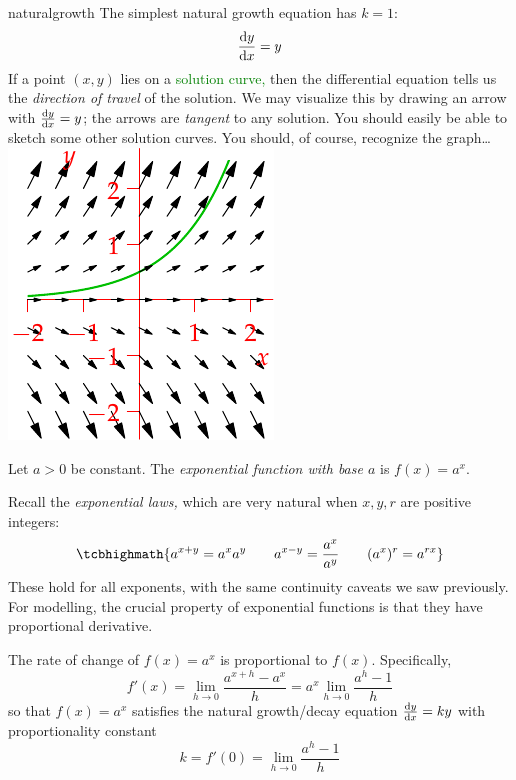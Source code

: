 \begin{example}[lower separated=false, sidebyside, sidebyside align=top seam, sidebyside gap=0pt, righthand width=0.28\linewidth]{}{naturalgrowth}
	The simplest natural growth equation has $k=1$:
	\[
		\diff[y]{x}=y
	\]
	If a point $(x,y)$ lies on a \textcolor{Green}{solution curve,} then the differential equation tells us the \emph{direction of travel} of the solution. We may visualize this by drawing an arrow with  $\diff[y]{x}=y$; the arrows are \emph{tangent} to any solution.\footnotemark{} You should easily be able to sketch some other solution curves.\smallbreak
	You should, of course, recognize the graph\ldots
	\tcblower
	\flushright\includegraphics[scale=1]{slopefields-01}
\end{example}



\begin{defn}{}{}
	Let $a>0$ be constant. The \emph{exponential function with base $a$} is $f(x)=a^x$.
\end{defn}

Recall the \emph{exponential laws,}\label{pg:explaws} which are very natural when $x,y,r$ are positive integers:
\[
	\tcbhighmath{a^{x+y}=a^xa^y\qquad a^{x-y}=\frac{a^x}{a^y}\qquad (a^x)^r=a^{rx}}
\]
These hold for all exponents, with the same continuity caveats we saw previously. 
For modelling, the crucial property of exponential functions is that they have proportional derivative.

\begin{thm}{}{}
	The rate of change of $f(x)=a^x$ is proportional to $f(x)$. Specifically,
	\[
		f'(x)=\lim_{h\to 0}\frac{a^{x+h}-a^x}h=a^x\lim_{h\to 0}\frac{a^{h}-1}h
	\]
	so that $f(x)=a^x$ satisfies the natural growth/decay equation $\diff[y]{x}=ky$ with proportionality constant
	\[
		k=f'(0)=\lim_{h\to 0}\frac{a^{h}-1}h
	\]
\end{thm}

